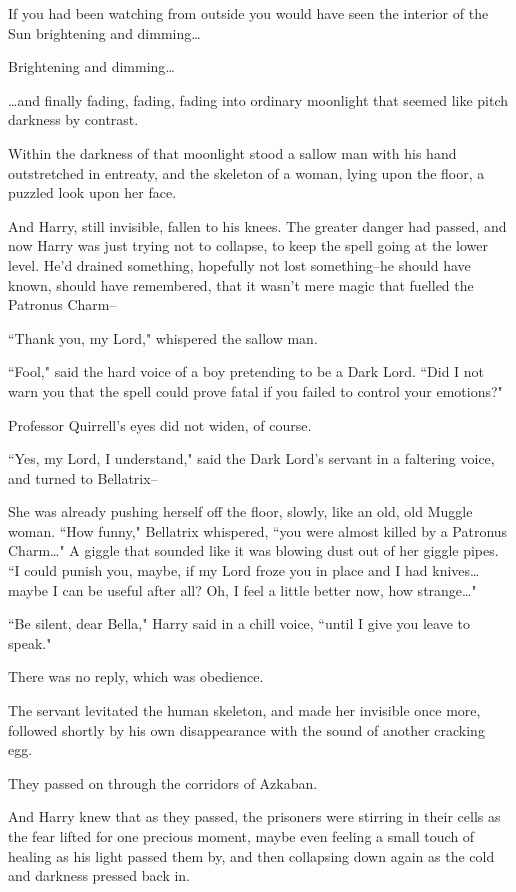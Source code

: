 If you had been watching from outside you would have seen the interior of the Sun brightening and dimming{\ldots}

Brightening and dimming{\ldots}

{\ldots}and finally fading, fading, fading into ordinary moonlight that seemed like pitch darkness by contrast.

Within the darkness of that moonlight stood a sallow man with his hand outstretched in entreaty, and the skeleton of a woman, lying upon the floor, a puzzled look upon her face.

And Harry, still invisible, fallen to his knees. The greater danger had passed, and now Harry was just trying not to collapse, to keep the spell going at the lower level. He'd drained something, hopefully not lost something\---he should have known, should have remembered, that it wasn't mere magic that fuelled the Patronus Charm\---

``Thank you, my Lord," whispered the sallow man.

``Fool," said the hard voice of a boy pretending to be a Dark Lord. ``Did I not warn you that the spell could prove fatal if you failed to control your emotions?"

Professor Quirrell's eyes did not widen, of course.

``Yes, my Lord, I understand," said the Dark Lord's servant in a faltering voice, and turned to Bellatrix\---

She was already pushing herself off the floor, slowly, like an old, old Muggle woman. ``How funny," Bellatrix whispered, ``you were almost killed by a Patronus Charm{\ldots}" A giggle that sounded like it was blowing dust out of her giggle pipes. ``I could punish you, maybe, if my Lord froze you in place and I had knives{\ldots} maybe I can be useful after all? Oh, I feel a little better now, how strange{\ldots}"

``Be silent, dear Bella," Harry said in a chill voice, ``until I give you leave to speak."

There was no reply, which was obedience.

The servant levitated the human skeleton, and made her invisible once more, followed shortly by his own disappearance with the sound of another cracking egg.

They passed on through the corridors of Azkaban.

And Harry knew that as they passed, the prisoners were stirring in their cells as the fear lifted for one precious moment, maybe even feeling a small touch of healing as his light passed them by, and then collapsing down again as the cold and darkness pressed back in.

